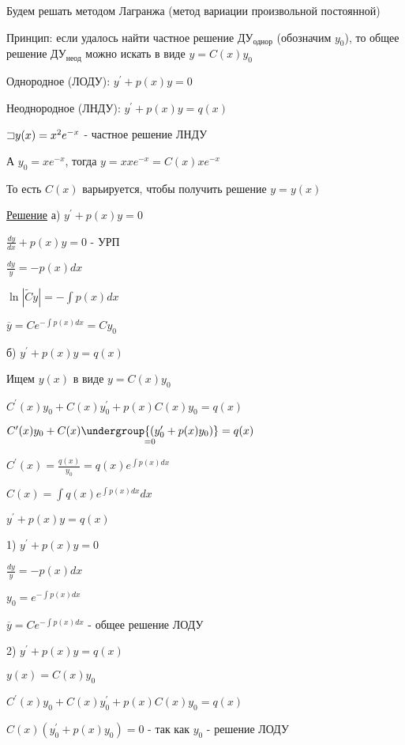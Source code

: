 \documentclass[12pt]{article}
\begin{document}
    \Nota Будем решать методом Лагранжа (метод вариации произвольной постоянной)

    Принцип: если удалось найти частное решение ДУ$_\text{однор}$ (обозначим $y_0$), то общее решение ДУ$_\text{неод}$
    можно искать в виде $y = C(x)y_0$

    \Def Однородное (ЛОДУ): $y^\prime + p(x)y = 0$

    \Def Неоднородное (ЛНДУ): $y^\prime + p(x)y = q(x)$

    \Ex $\mathord{\sqsupset} y(x) = x^2 e^{-x}$ - частное решение ЛНДУ

    А $y_0 = x e^{-x}$, тогда $y = x xe^{-x} = C(x) x e^{-x}$

    То есть $C(x)$ варьируется, чтобы получить решение $y = y(x)$

    \underline{Решение} а) $y^\prime + p(x)y = 0$

    $\frac{dy}{dx} + p(x)y = 0$ - УРП

    $\frac{dy}{y} = -p(x)dx$

    $\ln|\tilde{C}y| = -\int p(x)dx$

    $\overline{y} = Ce^{-\int p(x) dx} = Cy_0$

    б) $y^\prime + p(x)y = q(x)$

    Ищем $y(x)$ в виде $y = C(x)y_0$

    $C^\prime(x)y_0 + C(x)y^\prime_0 + p(x)C(x)y_0 = q(x)$

    $C^\prime(x)y_0 + C(x)\underset{=0}{\undergroup{(y^\prime_0 + p(x)y_0)}} = q(x)$

    $C^\prime(x) = \frac{q(x)}{y_0} = q(x)e^{\int p(x)dx}$

    $C(x) = \int q(x) e^{\int p(x)dx} dx$


    \Mem $y^\prime + p(x)y = q(x)$

    1) $y^\prime + p(x)y = 0$

    $\frac{dy}{y} = -p(x)dx$

    $y_0 = e^{-\int p(x)dx}$

    $\overline{y} = Ce^{-\int p(x)dx}$ - общее решение ЛОДУ

    2) $y^\prime + p(x)y = q(x)$

    $y(x) = C(x)y_0$

    $C^\prime(x)y_0 + C(x)y^\prime_0 + p(x)C(x)y_0 = q(x)$

    $C(x)(y_0^\prime + p(x)y_0) = 0$ - так как $y_0$ - решение ЛОДУ
\end{document}
